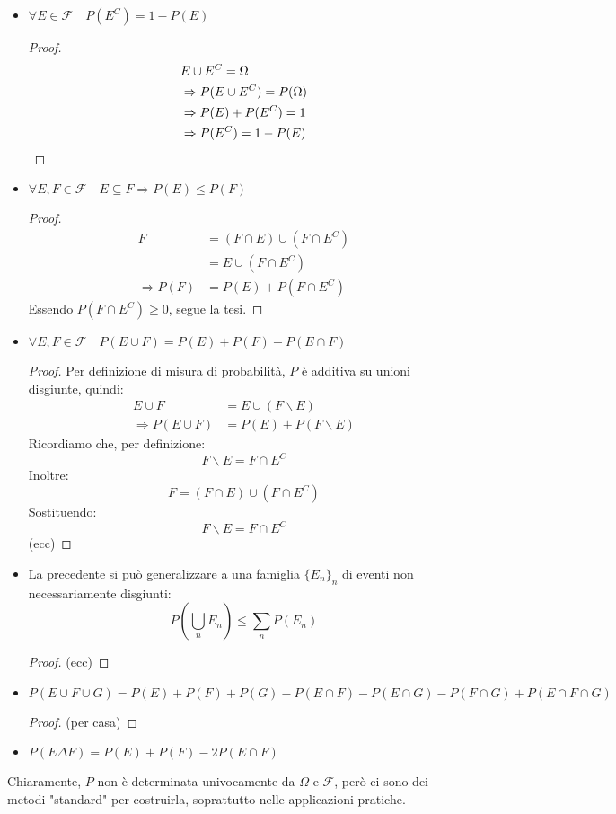 \documentclass{article}
\theoremstyle{plain}
\theoremstyle{definition}
\theoremstyle{remark}
\begin{document}
\begin{itemize}
	\item $\forall E\in\mathcal{F}\quad P(E^C)=1-P(E)$
	\begin{proof}
		\begin{align*}
			&E\cup E^C=\Omega\\
			&\Rightarrow P(E\cup E^C)=P(\Omega)\\
			&\Rightarrow P(E)+P(E^C)=1\\
			&\Rightarrow P(E^C)=1-P(E)\qedhere
		\end{align*}
	\end{proof}
	\item $\forall E,F\in\mathcal{F}\quad E\subseteq F\Rightarrow P(E)\leq P(F)$
	\begin{proof}
		\begin{align*}
			F&=(F\cap E)\cup(F\cap E^C)\\
			&=E\cup(F\cap E^C)\\
			\Rightarrow P(F)&=P(E)+P(F\cap E^C)
		\end{align*}
		Essendo $P(F\cap E^C)\geq0$, segue la tesi.
	\end{proof}
	\item $\forall E,F\in\mathcal{F}\quad P(E\cup F)=P(E)+P(F)-P(E\cap F)$
	\begin{proof}
		Per definizione di misura di probabilità, $P$ è additiva su unioni disgiunte, quindi:
		\begin{align*}
			E\cup F&=E\cup (F\smallsetminus E)\\
			\Rightarrow P(E\cup F)&=P(E)+P(F\smallsetminus E)
		\end{align*}
		Ricordiamo che, per definizione:
		\begin{equation*}
			F\smallsetminus E=F\cap E^C
		\end{equation*}
		Inoltre:
		\begin{equation*}
			F=(F\cap E)\cup(F\cap E^C)
		\end{equation*}
		Sostituendo:
		\begin{equation*}
			F\smallsetminus E=F\cap E^C
		\end{equation*}
		(ecc)%
	\end{proof}
	\item La precedente si può generalizzare a una famiglia $\{E_n\}_n$ di eventi non necessariamente disgiunti:
	\begin{equation*}
		P(\bigcup_n E_n)\leq \sum_n P(E_n)
	\end{equation*}
	\begin{proof}
		(ecc)
	\end{proof}
	\item $P(E\cup F\cup G)=P(E)+P(F)+P(G)-P(E\cap F)-P(E\cap G)-P(F\cap G)+P(E\cap F\cap G)$
	\begin{proof}
		(per casa)
	\end{proof}
	\item $P(E\Delta F)=P(E)+P(F)-2P(E\cap F)$
\end{itemize}
Chiaramente, $P$ non è determinata univocamente da $\Omega$ e $\mathcal{F}$, però ci sono dei metodi "standard" per costruirla, soprattutto nelle applicazioni pratiche.
\end{document}
